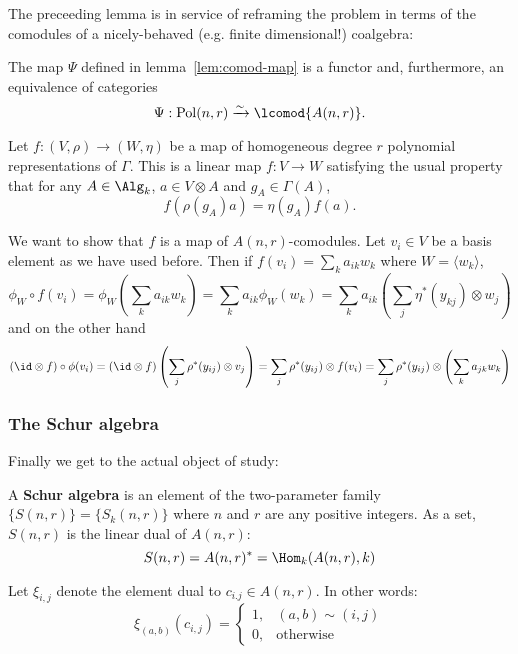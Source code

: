 \documentclass[12pt]{article}
\DeclareMathOperator{\Pol}{Pol}
\begin{document}
The preceeding lemma is in service of reframing the problem in terms of the comodules of a nicely-behaved (e.g. finite dimensional!) coalgebra:
\begin{lem}
	The map $\Psi$ defined in lemma~\ref{lem:comod-map} is a functor and, furthermore, an equivalence 
	of categories
	\[\Psi:\Pol(n,r)\xrightarrow{\sim}\lcomod{A(n,r)}.\]
\end{lem}
\begin{prf}
	Let $f:(V,\rho)\to (W,\eta)$ be a map of homogeneous degree $r$ polynomial representations of $\Gamma$. This is a linear map $f:V\to W$ 
	satisfying the usual property that for any $A\in\Alg_k$, $a\in V\otimes A$ and $g_A\in \Gamma(A)$,
	\[f(\rho(g_A)a)=\eta(g_A)f(a).\]

	We want to show that $f$ is a map of $A(n,r)$-comodules. Let $v_i\in V$ be a basis element as we have used before. Then if $f(v_i)=\sum_k a_{ik}w_{k}$ where $W=\langle w_k\rangle$,
	\[\phi_W\circ f(v_i)=\phi_W\left(\sum_ka_{ik}w_k\right)=\sum_ka_{ik}\phi_W(w_k)=\sum_ka_{ik}\left(\sum_j \eta^\ast(y_{kj})\otimes w_j\right)\]
	and on the other hand 
	\[(\id\otimes f)\circ\phi(v_i)=(\id\otimes f)\left(\sum_j\rho^\ast(y_{ij})\otimes v_j\right)=\sum_j\rho^\ast(y_{ij})\otimes f(v_i)=\sum_j\rho^\ast(y_{ij})\otimes\left(\sum _ka_{jk}w_k\right)\]
\end{prf}

\subsubsection{The Schur algebra}
Finally we get to the actual object of study:
\begin{defn}\label{def:schur-alg}
	A \textbf{Schur algebra} is an element of the two-parameter family $\{S(n,r)\}=\{S_k(n,r)\}$ where $n$ and $r$ are any positive integers.
	As a set, $S(n,r)$ is the linear dual of $A(n,r)$:
	\[S(n,r)=A(n,r)^\ast=\Hom_k(A(n,r),k)\] 

	Let $\xi_{i,j}$ denote the element dual to $c_{i.j}\in A(n,r)$. In other words:
	\[\xi_{(a,b)}(c_{i,j})=\begin{cases}
		1, & (a,b)\sim(i,j)\\
		0, & \text{otherwise}
	\end{cases}\]
\end{defn}
\end{document}
